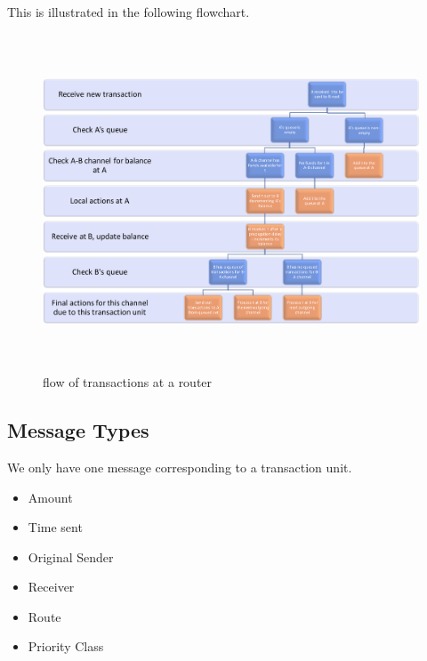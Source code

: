 \documentclass[a4paper]{article}
\newcommand{\TU}{transaction unit\xspace}
\begin{document}
This is illustrated in the following flowchart.
\begin{figure}[h]
\includegraphics[width=\linewidth,height=10cm]{router_flow.pdf}
\caption{flow of transactions at a router}
\label{fig:routerflow}
\end{figure}

\subsection{Message Types}
We only have one message corresponding to a \TU.
\begin{itemize}
            \item Amount
            \item Time sent
            \item Original Sender
            \item Receiver
            \item Route
            \item Priority Class

\end{itemize}
\end{document}
